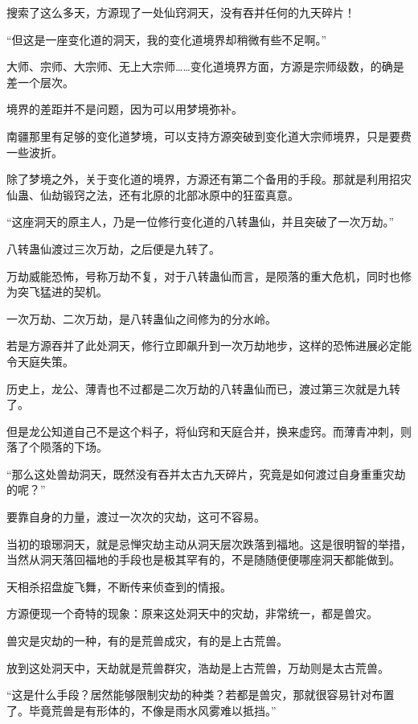 
\begin{this_body}

搜索了这么多天，方源现了一处仙窍洞天，没有吞并任何的九天碎片！

“但这是一座变化道的洞天，我的变化道境界却稍微有些不足啊。”

大师、宗师、大宗师、无上大宗师……变化道境界方面，方源是宗师级数，的确是差一个层次。

境界的差距并不是问题，因为可以用梦境弥补。

南疆那里有足够的变化道梦境，可以支持方源突破到变化道大宗师境界，只是要费一些波折。

除了梦境之外，关于变化道的境界，方源还有第二个备用的手段。那就是利用招灾仙蛊、仙劫锻窍之法，还有北原的北部冰原中的狂蛮真意。

“这座洞天的原主人，乃是一位修行变化道的八转蛊仙，并且突破了一次万劫。”

八转蛊仙渡过三次万劫，之后便是九转了。

万劫威能恐怖，号称万劫不复，对于八转蛊仙而言，是陨落的重大危机，同时也修为突飞猛进的契机。

一次万劫、二次万劫，是八转蛊仙之间修为的分水岭。

若是方源吞并了此处洞天，修行立即飙升到一次万劫地步，这样的恐怖进展必定能令天庭失策。

历史上，龙公、薄青也不过都是二次万劫的八转蛊仙而已，渡过第三次就是九转了。

但是龙公知道自己不是这个料子，将仙窍和天庭合并，换来虚窍。而薄青冲刺，则落了个陨落的下场。

“那么这处兽劫洞天，既然没有吞并太古九天碎片，究竟是如何渡过自身重重灾劫的呢？”

要靠自身的力量，渡过一次次的灾劫，这可不容易。

当初的琅琊洞天，就是忌惮灾劫主动从洞天层次跌落到福地。这是很明智的举措，当然从洞天落回福地的手段也是极其罕有的，不是随随便便哪座洞天都能做到。

天相杀招盘旋飞舞，不断传来侦查到的情报。

方源便现一个奇特的现象：原来这处洞天中的灾劫，非常统一，都是兽灾。

兽灾是灾劫的一种，有的是荒兽成灾，有的是上古荒兽。

放到这处洞天中，天劫就是荒兽群灾，浩劫是上古荒兽，万劫则是太古荒兽。

“这是什么手段？居然能够限制灾劫的种类？若都是兽灾，那就很容易针对布置了。毕竟荒兽是有形体的，不像是雨水风雾难以抵挡。”


\end{this_body}
